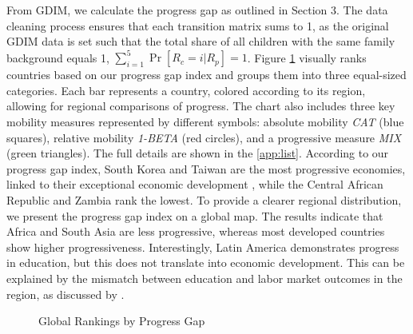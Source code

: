 From GDIM, we calculate the progress gap as outlined in Section 3. The data cleaning process ensures that each transition matrix sums to 1, as the original GDIM data is set such that the total share of all children with the same family background equals 1, \(\sum_{i=1}^{5} \operatorname{Pr}[R_c = i| R_p] = 1\). Figure \ref{fig:rank} visually ranks countries based on our progress gap index and groups them into three equal-sized categories. Each bar represents a country, colored according to its region, allowing for regional comparisons of progress. The chart also includes three key mobility measures represented by different symbols: absolute mobility \textit{CAT} (blue squares), relative mobility \textit{1-BETA} (red circles), and a progressive measure \textit{MIX} (green triangles). The full details are shown in the  \ref{app:list}. According to our progress gap index, South Korea and Taiwan are the most progressive economies, linked to their exceptional economic development \citep{morris1996asia}, while the Central African Republic and Zambia rank the lowest. To provide a clearer regional distribution, we present the progress gap index on a global map. The results indicate that Africa and South Asia are less progressive, whereas most developed countries show higher progressiveness. Interestingly, Latin America demonstrates progress in education, but this does not translate into economic development. This can be explained by the mismatch between education and labor market outcomes in the region, as discussed by \citet{bassi2012disconnected}.

\begin{landscape}
\begin{figure}[H]
    \centering
    \caption{Global Rankings by Progress Gap}
    \label{fig:rank}
\end{figure}
\end{landscape} 


